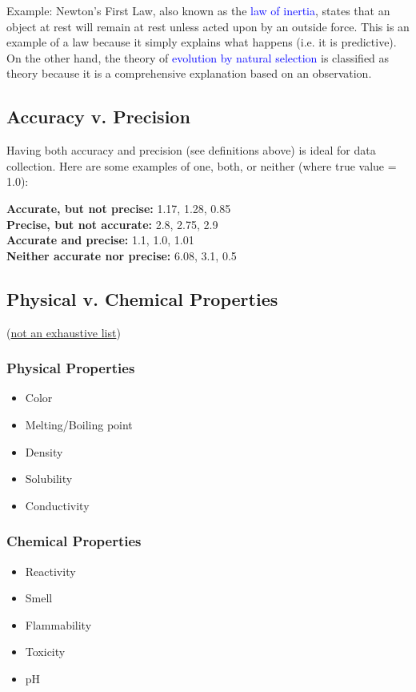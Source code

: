 \documentclass[a4paper, 12pt]{article}
\begin{document}
Example: Newton's First Law, also known as the \textcolor{blue}{law of inertia}, states that an object at rest will remain at rest unless acted upon by an outside force. This is an example of a law because it simply explains what happens (i.e. it is predictive). On the other hand, the theory of \textcolor{blue}{evolution by natural selection} is classified as theory because it is a comprehensive explanation based on an observation.

\subsection*{Accuracy v. Precision}
Having both accuracy and precision (see definitions above) is ideal for data collection. Here are some examples of one, both, or neither (where true value = 1.0):
 
\textbf{Accurate, but not precise:} 1.17, 1.28, 0.85
\\
\textbf{Precise, but not accurate:} 2.8, 2.75, 2.9
\\
\textbf{Accurate and precise:} 1.1, 1.0, 1.01
\\
\textbf{Neither accurate nor precise:} 6.08, 3.1, 0.5


\subsection*{Physical v. Chemical Properties}
(\underline{not an exhaustive list})

\subsubsection*{Physical Properties}
\begin{itemize}[leftmargin=*, nosep]
    \item Color
    \item Melting/Boiling point
    \item Density
    \item Solubility
    \item Conductivity
\end{itemize}

\subsubsection*{Chemical Properties}
\begin{itemize}[leftmargin=*, nosep]
    \item Reactivity
    \item Smell
    \item Flammability
    \item Toxicity
    \item pH
\end{itemize}
\end{document}
